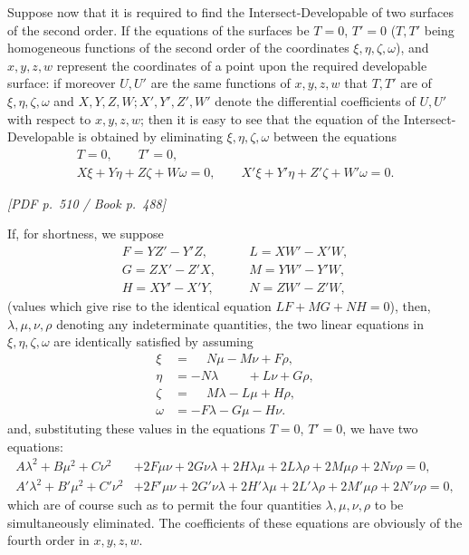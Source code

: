 \documentclass[11pt]{article}
\newcommand{\Page}[2]{\bigskip\noindent\textit{[PDF p.~#1 / Book p.~#2]}\par\smallskip}
\begin{document}
Suppose now that it is required to find the Intersect-Developable of two surfaces of
the second order. If the equations of the surfaces be $T=0$, $T'=0$ ($T,T'$ being
homogeneous functions of the second order of the coordinates $\xi,\eta,\zeta,\omega$),
and $x,y,z,w$ represent the coordinates of a point upon the required developable
surface: if moreover $U,U'$ are the same functions of $x,y,z,w$ that $T,T'$ are of
$\xi,\eta,\zeta,\omega$ and $X,Y,Z,W; X',Y',Z',W'$ denote the differential coefficients
of $U,U'$ with respect to $x,y,z,w$; then it is easy to see that the equation of the
Intersect-Developable is obtained by eliminating $\xi,\eta,\zeta,\omega$ between the
equations
\[
\begin{gathered}
T=0,\qquad T'=0,\\
X\xi+Y\eta+Z\zeta+W\omega=0,\qquad
X'\xi+Y'\eta+Z'\zeta+W'\omega=0.
\end{gathered}
\]

\Page{510}{488}

If, for shortness, we suppose
\[
\begin{array}{lll}
F=YZ'-Y'Z,&\quad& L=XW'-X'W,\\
G=ZX'-Z'X,&& M=YW'-Y'W,\\
H=XY'-X'Y,&& N=ZW'-Z'W,
\end{array}
\]
(values which give rise to the identical equation $LF+MG+NH=0$), then,
$\lambda,\mu,\nu,\rho$ denoting any indeterminate quantities, the two linear equations
in $\xi,\eta,\zeta,\omega$ are identically satisfied by assuming
\[
\begin{aligned}
\xi&=\phantom{-}N\mu-M\nu+F\rho,\\
\eta&=-N\lambda\phantom{-M\nu}+L\nu+G\rho,\\
\zeta&=\phantom{-}M\lambda-L\mu+H\rho,\\
\omega&=-F\lambda-G\mu-H\nu.
\end{aligned}
\]
and, substituting these values in the equations $T=0$, $T'=0$, we have two equations:
\[
\begin{aligned}
A\lambda^2+B\mu^2+C\nu^2&+2F\mu\nu+2G\nu\lambda+2H\lambda\mu
       +2L\lambda\rho+2M\mu\rho+2N\nu\rho=0,\\
A'\lambda^2+B'\mu^2+C'\nu^2&+2F'\mu\nu+2G'\nu\lambda+2H'\lambda\mu
       +2L'\lambda\rho+2M'\mu\rho+2N'\nu\rho=0,
\end{aligned}
\]
which are of course such as to permit the four quantities $\lambda,\mu,\nu,\rho$ to
be simultaneously eliminated. The coefficients of these equations are obviously of the
fourth order in $x,y,z,w$.
\end{document}
